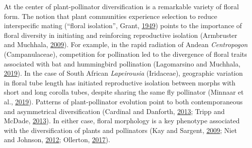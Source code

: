 \documentclass[]{article}
\begin{document}
At the center of plant-pollinator diversification is a remarkable
variety of floral form. The notion that plant communities experience
selection to reduce interspecific mating (``floral isolation'', Grant,
\protect\hyperlink{ref-grant_1949}{1949}) points to the importance of
floral diversity in initiating and reinforcing reproductive isolation
(Armbruster and Muchhala,
\protect\hyperlink{ref-armbruster_2009}{2009}). For example, in the
rapid radiation of Andean \emph{Centropogon} (Campanulaceae),
competition for pollination led to the divergence of floral traits
associated with bat and hummingbird pollination (Lagomarsino and
Muchhala, \protect\hyperlink{ref-lagomarsino_2019}{2019}). In the case
of South African \emph{Lapeirousia} (Iridaceae), geographic variation in
floral tube length has initiated reproductive isolation between morphs
with short and long corolla tubes, despite sharing the same fly
pollinator (Minnaar et al., \protect\hyperlink{ref-minnaar_2019}{2019}).
Patterns of plant-pollinator evolution point to both contemporaneous and
asymmetrical diversification (Cardinal and Danforth,
\protect\hyperlink{ref-cardinal_2013}{2013}; Tripp and McDade,
\protect\hyperlink{ref-tripp_2013}{2013}). In either case, floral
morphology is a key phenotype associated with the diversification of
plants and pollinators (Kay and Sargent,
\protect\hyperlink{ref-kay_2009}{2009}; Niet and Johnson,
\protect\hyperlink{ref-vanderniet_2012}{2012}; Ollerton,
\protect\hyperlink{ref-ollerton_2017}{2017}).
\end{document}
